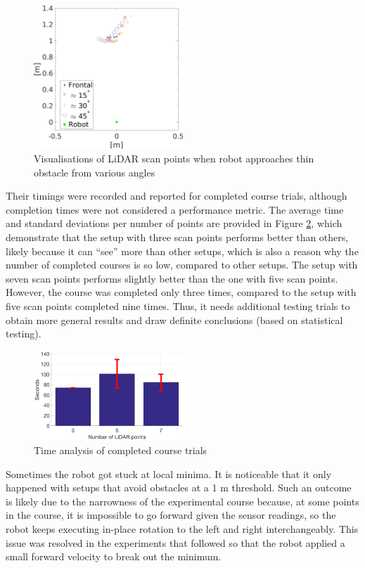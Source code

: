 \begin{figure}
\centering
\includegraphics[width=0.5\textwidth]{slike/tocke}
\caption{Visualisations of LiDAR scan points when robot approaches thin obstacle from various angles}
\label{Fig:Tocke}
\end{figure}

Their timings were recorded and reported for completed course trials, although completion times were not considered a performance metric. The average time and standard deviations per number of points are provided in Figure \ref{Fig:Vrimena}, which demonstrate that the setup with three scan points performs better than others, likely because it can ``see'' more than other setups, which is also a reason why the number of completed courses is so low, compared to other setups. The setup with seven scan points performs slightly better than the one with five scan points. However, the course was completed only three times, compared to the setup with five scan points completed nine times. Thus, it needs additional testing trials to obtain more general results and draw definite conclusions (based on statistical testing).

\begin{figure}
\centering
\includegraphics[width=0.5\textwidth]{slike/vrimena}
\caption{Time analysis of completed course trials}
\label{Fig:Vrimena}
\end{figure}

Sometimes the robot got stuck at local minima. It is noticeable that it only happened with setups that avoid obstacles at a 1 m threshold. Such an outcome is likely due to the narrowness of the experimental course because, at some points in the course, it is impossible to go forward given the sensor readings, so the robot keeps executing in-place rotation to the left and right interchangeably. This issue was resolved in the experiments that followed so that the robot applied a small forward velocity to break out the minimum.

